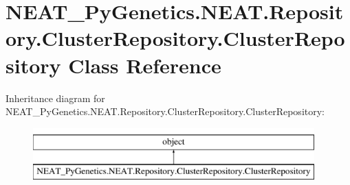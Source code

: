 \hypertarget{classNEAT__PyGenetics_1_1NEAT_1_1Repository_1_1ClusterRepository_1_1ClusterRepository}{}\section{N\+E\+A\+T\+\_\+\+Py\+Genetics.\+N\+E\+A\+T.\+Repository.\+Cluster\+Repository.\+Cluster\+Repository Class Reference}
\label{classNEAT__PyGenetics_1_1NEAT_1_1Repository_1_1ClusterRepository_1_1ClusterRepository}
Inheritance diagram for N\+E\+A\+T\+\_\+\+Py\+Genetics.\+N\+E\+A\+T.\+Repository.\+Cluster\+Repository.\+Cluster\+Repository\+:\begin{figure}[H]
\begin{center}
\leavevmode
\includegraphics[height=2.000000cm]{classNEAT__PyGenetics_1_1NEAT_1_1Repository_1_1ClusterRepository_1_1ClusterRepository}
\end{center}
\end{figure}
